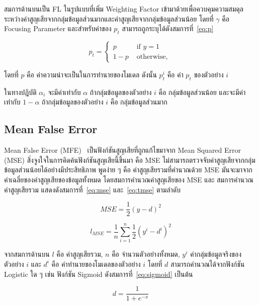 สมการด้านบนเป็น FL ในรูปแบบที่เพิ่ม Weighting Factor เข้ามาด้วยเพื่อควบคุมความสมดุลระหว่างค่าสูญเสียจากกลุ่มข้อมูลส่วนมากและค่าสูญเสียจากกลุ่มข้อมูลส่วนน้อย โดยที่ $\gamma$ คือ Focusing Parameter และสำหรับค่าของ $p_{t}$ สามารถถูกระบุได้ดังสมการที่~\ref{eq:p}

\begin{equation} \label{eq:p}
	p_{t} = 
	\begin{cases}
		p & \text{ if } y = 1\\ 
		1 - p & \text{ otherwise, } 
	\end{cases}
\end{equation} 

โดยที่ $p$ คือ ค่าความน่าจะเป็นในการทำนายของโมเดล ดังนั้น $p_{t}^{i}$ คือ ค่า $p_{t}$ ของตัวอย่าง $i$

ในทางปฎิบัติ $\alpha_{i}$ จะมีค่าเท่ากับ $\alpha$ ถ้ากลุ่มข้อมูลของตัวอย่าง $i$ คือ กลุ่มข้อมูลส่วนน้อย และจะมีค่าเท่ากับ $1-\alpha$ ถ้ากลุ่มข้อมูลของตัวอย่าง $i$ คือ กลุ่มข้อมูลส่วนมาก

\subsection{Mean False Error}
Mean False Error (MFE)~\cite{Wang:2016} เป็นฟังก์ชันสูญเสียที่ถูกแก้ไขมาจาก Mean Squared Error (MSE) สิ่งจูงใจในการคิดค้นฟังก์ชันสูญเสียนี้ขึ้นมา คือ MSE ไม่สามารถตรวจจับค่าสูญเสียจากกลุ่มข้อมูลส่วนน้อยได้อย่างมีประสิทธิภาพ พูดง่าย ๆ คือ ค่าสูญเสียรวมที่คำนวณด้วย MSE มันจะมาจากค่าเฉลี่ยของค่าสูญเสียของข้อมูลทั้งหมด โดยสมการคำนวณค่าสูญเสียของ MSE และ สมการคำนวณค่าสูญเสียรวม แสดงดังสมการที่~\ref{eq:mse} และ~\ref{eq:tmse} ตามลำดับ

\begin{equation} \label{eq:mse}
    MSE = \frac{1}{2}(y - d)^{2}
\end{equation}

\begin{equation} \label{eq:tmse}
    l_{MSE} = \frac{1}{n}\sum_{i=1}^{n}\frac{1}{2}(y^{i} - d^{i})^{2}
\end{equation}

จากสมการด้านบน $l$ คือ ค่าสูญเสียรวม, $n$ คือ จำนวนตัวอย่างทั้งหมด, $y^{i}$ ค่ากลุ่มข้อมูลจริงของตัวอย่าง $i$ และ $d^{i}$ คือ ค่าทำนายของโมเดลของตัวอย่าง $i$ โดยที่ $d$ สามารถคำนวณได้จากฟังก์ชัน Logistic ใด ๆ เช่น ฟังก์ชัน Sigmoid ดังสมการที่~\ref{eq:sigmoid} เป็นต้น

\begin{equation} \label{eq:sigmoid}
d =  \frac{\mathrm{1} }{\mathrm{1} + e^{-x} }
\end{equation}

